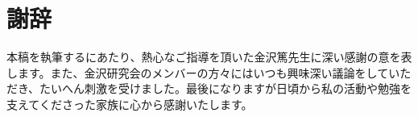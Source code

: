 \chapter*{謝辞}
本稿を執筆するにあたり、熱心なご指導を頂いた金沢篤先生に深い感謝の意を表します。また、金沢研究会のメンバーの方々にはいつも興味深い議論をしていただき、たいへん刺激を受けました。最後になりますが日頃から私の活動や勉強を支えてくださった家族に心から感謝いたします。